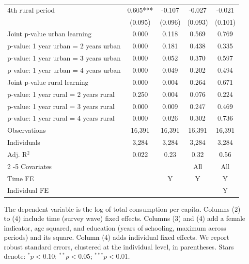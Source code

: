 \begin{table}[htbp]
\begin{threeparttable}
\begin{tabular}{l cccc}
4th rural period    &       0.605***&      -0.107   &      -0.027   &      -0.021   \\
                    &     (0.095)   &     (0.096)   &     (0.093)   &     (0.101)   \\
\addlinespace
Joint p-value urban learning&       0.000   &       0.118   &       0.569   &       0.769   \\
p-value: 1 year urban = 2 years urban&       0.000   &       0.181   &       0.438   &       0.335   \\
p-value: 1 year urban = 3 years urban&       0.000   &       0.052   &       0.370   &       0.597   \\
p-value: 1 year urban = 4 years urban&       0.000   &       0.049   &       0.202   &       0.494   \\
Joint p-value rural learning&       0.000   &       0.004   &       0.264   &       0.671   \\
p-value: 1 year rural = 2 years rural&       0.250   &       0.004   &       0.076   &       0.224   \\
p-value: 1 year rural = 3 years rural&       0.000   &       0.009   &       0.247   &       0.469   \\
p-value: 1 year rural = 4 years rural&       0.000   &       0.026   &       0.302   &       0.736   \\
Observations        &      16,391   &      16,391   &      16,391   &      16,391   \\
Individuals         &       3,284   &       3,284   &       3,284   &       3,284   \\
Adj. R$^{2}$        &       0.022   &        0.23   &        0.32   &        0.56   \\
\cmidrule{2 -5} Covariates & & & All & All \\ Time FE & & Y & Y & Y \\ Individual FE & & & & Y \\ \bottomrule \end{tabular} \begin{tablenotes}[flushleft] \footnotesize \item{The dependent variable is the log of total consumption per capita. Columns (2) to (4) include time (survey wave) fixed effects. Columns (3) and (4) add a female indicator, age squared, and education (years of schooling, maximum across periods) and its square. Column (4) adds individual fixed effects. We report robust standard errors, clustered at the individual level, in parentheses. Stars denote: $^{*} p<0.10$; $^{**} p<0.05$; $^{***} p<0.01$.} \end{tablenotes} \end{threeparttable} \end{table}
